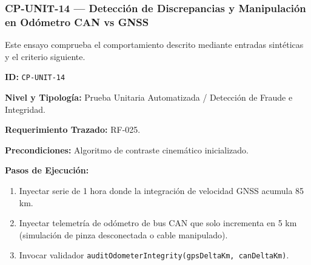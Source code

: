 \subsubsection*{CP-UNIT-14 — Detección de Discrepancias y Manipulación en Odómetro CAN vs GNSS}\label{sec:9-cp-unit-14}
Este ensayo comprueba el comportamiento descrito mediante entradas sintéticas y el criterio siguiente.

\par\noindent\textbf{ID:} \texttt{C\allowbreak{}P\allowbreak{}-\allowbreak{}U\allowbreak{}N\allowbreak{}I\allowbreak{}T\allowbreak{}-\allowbreak{}1\allowbreak{}4\allowbreak{}}\par
\par\noindent\textbf{Nivel y Tipología:} Prueba Unitaria Automatizada / Detección de Fraude e Integridad.\par
\par\noindent\textbf{Requerimiento Trazado:} RF-025.\par
\par\noindent\textbf{Precondiciones:} Algoritmo de contraste cinemático inicializado.\par
\par\noindent\textbf{Pasos de Ejecución:} \par
\begin{enumerate}
\item Inyectar serie de 1 hora donde la integración de velocidad GNSS acumula 85 km.
\item Inyectar telemetría de odómetro de bus CAN que solo incrementa en 5 km (simulación de pinza desconectada o cable manipulado).
\item Invocar validador \texttt{a\allowbreak{}u\allowbreak{}d\allowbreak{}i\allowbreak{}t\allowbreak{}O\allowbreak{}d\allowbreak{}o\allowbreak{}m\allowbreak{}e\allowbreak{}t\allowbreak{}e\allowbreak{}r\allowbreak{}I\allowbreak{}n\allowbreak{}t\allowbreak{}e\allowbreak{}g\allowbreak{}r\allowbreak{}i\allowbreak{}t\allowbreak{}y\allowbreak{}(\allowbreak{}g\allowbreak{}p\allowbreak{}s\allowbreak{}D\allowbreak{}e\allowbreak{}l\allowbreak{}t\allowbreak{}a\allowbreak{}K\allowbreak{}m\allowbreak{},\allowbreak{} c\allowbreak{}a\allowbreak{}n\allowbreak{}D\allowbreak{}e\allowbreak{}l\allowbreak{}t\allowbreak{}a\allowbreak{}K\allowbreak{}m\allowbreak{})\allowbreak{}}.
\end{enumerate}
